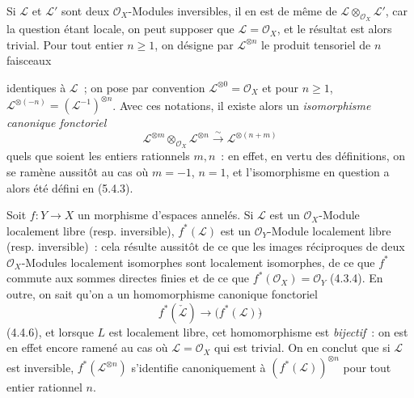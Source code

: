 \begin{env}[5.4.4]
\label{0.5.4.4-fr}
Si $\mathcal{L}$ et $\mathcal{L}'$ sont deux $\mathcal{O}_X$-Modules
inversibles, il en est de même de
$\mathcal{L}\otimes_{\mathcal{O}_X}\mathcal{L}'$, car la question étant
locale, on peut supposer que $\mathcal{L}=\mathcal{O}_X$, et le résultat est
alors trivial. Pour tout entier $n\geq1$, on désigne par
$\mathcal{L}^{\otimes n}$ le produit tensoriel de $n$ faisceaux


identiques à $\mathcal{L}$~; on pose par convention
$\mathcal{L}^{\otimes0}=\mathcal{O}_X$ et pour $n\geq1$,
$\mathcal{L}^{\otimes(-n)}=(\mathcal{L}^{-1})^{\otimes n}$. Avec ces
notations, il existe alors un \emph{isomorphisme canonique fonctoriel}
\[
  \mathcal{L}^{\otimes m}\otimes_{\mathcal{O}_X}\mathcal{L}^{\otimes n}
  \xrightarrow{\sim}
  \mathcal{L}^{\otimes(n+m)}
  \tag{5.4.4.1}\label{0.5.4.4.1-fr}
\]
quels que soient les entiers rationnels $m,n$~: en effet, en vertu des
définitions, on se ramène aussitôt au cas où $m=-1$, $n=1$, et
l'isomorphisme en question a alors été défini en (5.4.3).
\end{env}

\begin{env}[5.4.5]
Soit $f:Y\to X$ un morphisme d'espaces annelés. Si $\mathcal{L}$ est un
$\mathcal{O}_X$-Module localement libre (resp. inversible),
$f^*(\mathcal{L})$ est un $\mathcal{O}_Y$-Module localement libre (resp.
inversible)~: cela résulte aussitôt de ce que les images réciproques de deux
$\mathcal{O}_X$-Modules localement isomorphes sont localement isomorphes, de
ce que $f^*$ commute aux sommes directes finies et de ce que
$f^*(\mathcal{O}_X)=\mathcal{O}_Y$ (4.3.4). En outre, on sait qu'on a un
homomorphisme canonique fonctoriel
\[
  f^*(\check{\mathcal{L}})
  \longrightarrow
  \bigl(f^*(\mathcal{L})\bigr)\check{}
\]
(4.4.6), et lorsque $L$ est localement libre, cet homomorphisme est
\emph{bijectif}~: on est en effet encore ramené au cas où
$\mathcal{L}=\mathcal{O}_X$ qui est trivial. On en conclut que si
$\mathcal{L}$ est inversible, $f^*(\mathcal{L}^{\otimes n})$ s'identifie
canoniquement à $(f^*(\mathcal{L}))^{\otimes n}$ pour tout entier rationnel
$n$.
\end{env}

